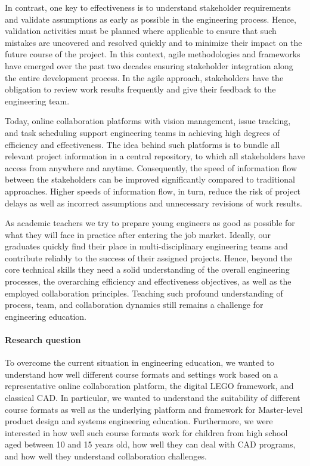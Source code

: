 \documentclass{PDS}
\begin{document}
In contrast, one key to effectiveness is to understand stakeholder requirements and validate assumptions as early as possible in the engineering process.
Hence, validation activities must be planned where applicable to ensure that such mistakes are uncovered and resolved quickly and to minimize their impact on the future course of the project.
In this context, agile methodologies and frameworks have emerged over the past two decades ensuring stakeholder integration along the entire development process.
In the agile approach, stakeholders have the obligation to review work results frequently and give their feedback to the engineering team.

Today, online collaboration platforms with vision management, issue tracking, and task scheduling support engineering teams in achieving high degrees of efficiency and effectiveness.
The idea behind such platforms is to bundle all relevant project information in a central repository, to which all stakeholders have access from anywhere and anytime.
Consequently, the speed of information flow between the stakeholders can be improved significantly compared to traditional approaches.
Higher speeds of information flow, in turn, reduce the risk of project delays as well as incorrect assumptions and unnecessary revisions of work results.

As academic teachers we try to prepare young engineers as good as possible for what they will face in practice after entering the job market.
Ideally, our graduates quickly find their place in multi-disciplinary engineering teams and contribute reliably to the success of their assigned projects.
Hence, beyond the core technical skills they need a solid understanding of the overall engineering processes, the overarching efficiency and effectiveness objectives, as well as the employed collaboration principles.
Teaching such profound understanding of process, team, and collaboration dynamics still remains a challenge for engineering education.

\paragraph{Research question}

To overcome the current situation in engineering education, we wanted to understand how well different course formats and settings work based on a representative online collaboration platform, the digital LEGO framework, and classical CAD.
In particular, we wanted to understand the suitability of different course formats as well as the underlying platform and framework for Master-level product design and systems engineering education.
Furthermore, we were interested in how well such course formats work for children from high school aged between 10 and 15 years old, how well they can deal with CAD programs, and how well they understand collaboration challenges.
\end{document}
